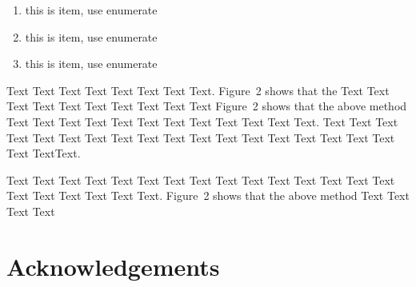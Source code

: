 \documentclass{bioinfo}
\begin{document}
%
%





\begin{enumerate}
\item this is item, use enumerate
\item this is item, use enumerate
\item this is item, use enumerate
\end{enumerate}


Text Text Text Text Text Text Text Text.
Figure~2\vphantom{\ref{fig:02}} shows\vadjust{\pagebreak} that the
 Text Text Text Text Text Text  Text Text Text Text
Figure~2\vphantom{\ref{fig:02}} shows that the above method  Text
Text Text Text Text Text Text Text Text Text  Text Text.
Text Text Text Text Text Text  Text Text Text Text Text Text Text
Text Text Text Text Text Text Text\break Text.


Text Text Text Text Text Text  Text Text Text Text Text Text Text
Text Text  Text Text Text Text Text Text.
Figure~2\vphantom{\ref{fig:02}} shows that the above method  Text
Text Text Text\vspace*{-10pt}


\section*{Acknowledgements}


%
%
%
%
%
%
%
%
%
\end{document}
